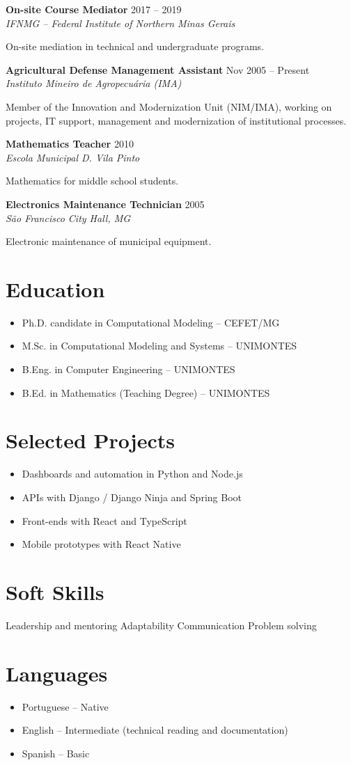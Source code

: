 \documentclass[a4paper,10pt]{article}
\newcommand{\job}[3]{\noindent\textbf{#1} \hfill #3\\\textit{#2}\par}
\begin{document}
\medskip
\job{On-site Course Mediator}{IFNMG -- Federal Institute of Northern Minas Gerais}{2017 -- 2019}
On-site mediation in technical and undergraduate programs.

\medskip
\job{Agricultural Defense Management Assistant}{Instituto Mineiro de Agropecuária (IMA)}{Nov 2005 -- Present}
Member of the Innovation and Modernization Unit (NIM/IMA), working on projects, IT support, management and modernization of institutional processes.

\medskip
\job{Mathematics Teacher}{Escola Municipal D. Vila Pinto}{2010}
Mathematics for middle school students.

\medskip
\job{Electronics Maintenance Technician}{São Francisco City Hall, MG}{2005}
Electronic maintenance of municipal equipment.

\section*{Education}
\begin{itemize}
    \item Ph.D. candidate in Computational Modeling -- CEFET/MG
    \item M.Sc. in Computational Modeling and Systems -- UNIMONTES
    \item B.Eng. in Computer Engineering -- UNIMONTES
    \item B.Ed. in Mathematics (Teaching Degree) -- UNIMONTES
\end{itemize}

\section*{Selected Projects}
\begin{itemize}
    \item Dashboards and automation in Python and Node.js
    \item APIs with Django / Django Ninja and Spring Boot
    \item Front-ends with React and TypeScript
    \item Mobile prototypes with React Native
\end{itemize}

\section*{Soft Skills}
Leadership and mentoring \textbullet{} Adaptability \textbullet{} Communication \textbullet{} Problem solving

\section*{Languages}
\begin{itemize}
    \item Portuguese -- Native
    \item English -- Intermediate (technical reading and documentation)
    \item Spanish -- Basic
\end{itemize}
\end{document}
